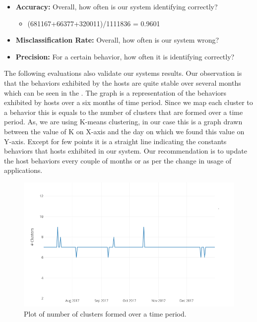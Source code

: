 \begin{itemize}
	\item \textbf{Accuracy:} Overall, how often is our system identifying correctly?
	\begin{itemize}
		
		\item (681167+66377+320011)/1111836 = 0.9601
		
	\end{itemize}
	
	\item \textbf{Misclassification Rate:} Overall, how often is our system wrong?
	
	
	\item \textbf{Precision:} For a certain behavior, how often it is identifying correctly?

	
\end{itemize}

The following evaluations also validate our systems results.
Our observation is that the behaviors exhibited by the hosts are quite stable over several months which can be seen in the  . The graph is a representation of the behaviors exhibited by hosts over a six months of time period. Since we map each cluster to a behavior this is equals to the number of clusters that are formed over a time period. As, we are using K-means clustering, in our case this is a graph drawn between the  value of K on X-axis and the day on which we found this value on Y-axis. Except for few points it is a straight line indicating the constants behaviors that hosts exhibited in our system. Our recommendation is to update the host behaviors every couple of months or as per the change in usage of applications.

\begin{figure}[t]
	\centerline{\includegraphics{constant.png}}
	\caption{ Plot of number of clusters formed over a time period.}%
\end{figure}